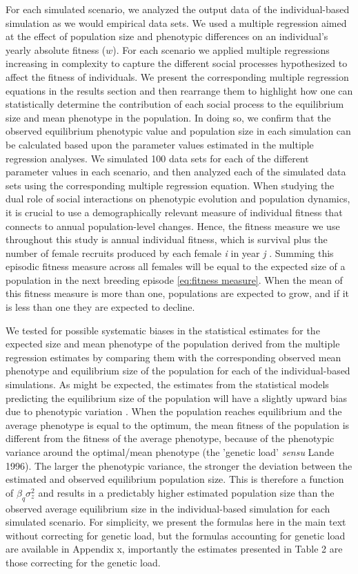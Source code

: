 \documentclass{article}
\begin{document}
For each simulated scenario, we analyzed the output data of the individual-based simulation as we would empirical data sets. We used a multiple regression aimed at the effect of population size and phenotypic differences on an individual's yearly absolute fitness ($w$). For each scenario we applied multiple regressions increasing in complexity to capture the different social processes hypothesized to  affect the fitness of individuals. We present the corresponding multiple regression equations in the results section and then rearrange them to highlight how one can statistically determine the contribution of each social process to the equilibrium size and mean phenotype in the population. In doing so, we confirm that the observed equilibrium phenotypic value and population size in each simulation can be calculated based upon the parameter values estimated in the multiple regression analyses. We simulated 100 data sets for each of the different parameter values in each scenario, and then analyzed each of the simulated data sets using the corresponding multiple regression equation. When studying the dual role of social interactions on phenotypic evolution and population dynamics, it is crucial to use a demographically relevant measure of individual fitness that connects to annual population-level changes. Hence, the fitness measure we use throughout this study is annual individual fitness, which is survival plus the number of female recruits produced by each female \textit{i} in year \textit{j} \citep{Saether2015}. Summing this episodic fitness measure across all females will be equal to the expected size of a population in the next breeding episode \ref{eq:fitness measure}. When the mean of this fitness measure is more than one, populations are expected to grow, and if it is less than one they are expected to decline. 

We tested for possible systematic biases in the statistical estimates for the expected size and mean phenotype of the population derived from the multiple regression estimates by comparing them with the corresponding observed mean phenotype and equilibrium size of the population for each of the individual-based simulations. As might be expected, the estimates from the statistical models predicting the equilibrium size of the population will have a slightly upward bias due to phenotypic variation \citep{Lande1996}. When the population reaches equilibrium and the average phenotype is equal to the optimum, the mean fitness of the population is different from the fitness of the average phenotype, because of the phenotypic variance around the optimal/mean phenotype (the 'genetic load' \textit{sensu} Lande 1996). The larger the phenotypic variance, the stronger the deviation between the estimated and observed equilibrium population size. This is therefore a function of $\beta_q \sigma^2_z$ and results in a predictably higher estimated population size than the observed average equilibrium size in the individual-based simulation for each simulated scenario. For simplicity, we present the formulas here in the main text without correcting for genetic load, but the formulas accounting for genetic load are available in Appendix x, importantly the estimates presented in Table 2 are those correcting for the genetic load.   
\end{document}
